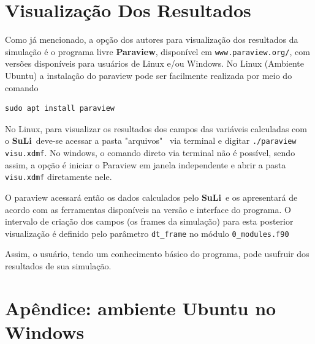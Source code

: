 \documentclass[12pt, a4paper]{article}
\newcommand{\SL}{{\bf SuLi}}
\begin{document}

\newpage
\section{Visualização Dos Resultados}	\label{visu}
Como já mencionado, a opção dos autores para visualização dos resultados da simulação é o programa livre \textbf{Paraview}, disponível em \verb|www.paraview.org/|, com versões disponíveis para usuários de Linux e/ou Windows. No Linux (Ambiente Ubuntu) a instalação do paraview pode ser facilmente realizada por meio do comando 

\begin{verbatim}
sudo apt install paraview
\end{verbatim}

No Linux, para visualizar os resultados dos campos das variáveis calculadas com o \SL\ deve-se acessar a pasta "arquivos" \, via terminal e digitar \verb|./paraview visu.xdmf|. No windows, o comando direto via terminal não é possível, sendo assim, a opção é iniciar o Paraview em janela independente e abrir a pasta \verb|visu.xdmf| diretamente nele.



O paraview acessará então os dados calculados pelo \SL\ e os apresentará de acordo com as ferramentas disponíveis na versão e interface do programa. O intervalo de criação dos campos (os frames da simulação) para esta posterior visualização é definido pelo parâmetro \verb|dt_frame| no módulo \verb|0_modules.f90|

Assim, o usuário, tendo um conhecimento básico do programa, pode usufruir dos resultados de sua simulação.




\newpage
\appendix
\section{Apêndice: ambiente Ubuntu no Windows}
\label{InstallUbuntu}
\end{document}
